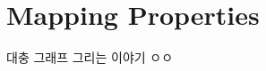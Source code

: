 \documentclass[../complex_variables_1.tex]{subfiles}
\begin{document}
\section{Mapping Properties}

대충 그래프 그리는 이야기 ㅇㅇ
\end{document}
